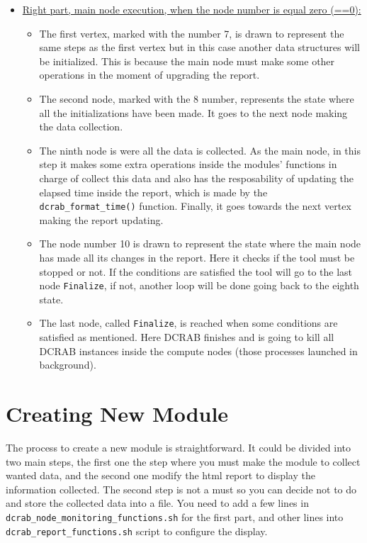 \documentclass[10pt,a4paper]{report}
\begin{document}
\begin{itemize}
  \item \underline{Right part, main node execution, when the node number is equal zero (==0): }
  \begin{itemize}
    \item The first vertex, marked with the number 7, is drawn to represent the same steps as the first vertex but in this case another data structures will be initialized. This is because the main node must make some other operations in the moment of upgrading the report.
    \item The second node, marked with the 8 number, represents the state where all the initializations have been made. It goes to the next node making the data collection.
    \item The ninth node is were all the data is collected. As the main node, in this step it makes some extra operations inside the modules' functions in charge of collect this data and also has the resposability of updating the elapsed time inside the report, which is made by the \texttt{dcrab\_format\_time()} function. Finally, it goes towards the next vertex making the report updating.
    \item The node number 10 is drawn to represent the state where the main node has made all its changes in the report. Here it checks if the tool must be stopped or not. If the conditions are satisfied the tool will go to the last node \verb+Finalize+, if not, another loop will be done going back to the eighth state.
    \item The last node, called \verb+Finalize+, is reached when some conditions are satisfied as mentioned. Here DCRAB finishes and is going to kill all DCRAB instances inside the compute nodes (those processes launched in background).
  \end{itemize}
\end{itemize}

\chapter{Creating New Module}

The process to create a new module is straightforward. It could be divided into two main steps, the first one the step where you must make the module to collect wanted data, and the second one modify the html report to display the information collected. The second step is not a must so you can decide not to do and store the collected data into a file. You need to add a few lines in \texttt{dcrab\_node\_monitoring\_functions.sh} for the first part, and other lines into \texttt{dcrab\_report\_functions.sh} script to configure the display.
\end{document}
